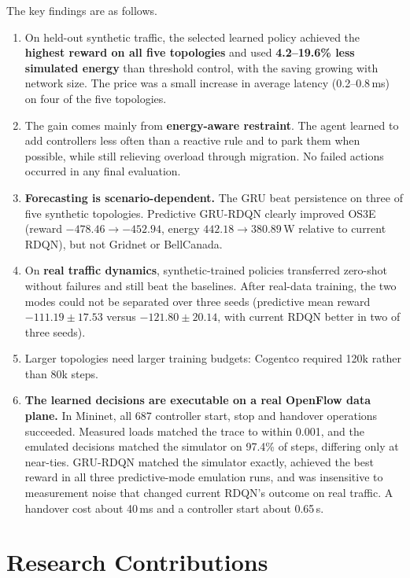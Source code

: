 The key findings are as follows.
\begin{enumerate}[leftmargin=*]
  \item On held-out synthetic traffic, the selected learned policy achieved the \textbf{highest reward on all five topologies} and used \textbf{4.2--19.6\% less simulated energy} than threshold control, with the saving growing with network size. The price was a small increase in average latency (0.2--0.8\,ms) on four of the five topologies.
  \item The gain comes mainly from \textbf{energy-aware restraint}. The agent learned to add controllers less often than a reactive rule and to park them when possible, while still relieving overload through migration. No failed actions occurred in any final evaluation.
  \item \textbf{Forecasting is scenario-dependent.} The GRU beat persistence on three of five synthetic topologies. Predictive GRU-RDQN clearly improved OS3E (reward $-478.46\rightarrow-452.94$, energy $442.18\rightarrow380.89$\,W relative to current RDQN), but not Gridnet or BellCanada.
  \item On \textbf{real traffic dynamics}, synthetic-trained policies transferred zero-shot without failures and still beat the baselines. After real-data training, the two modes could not be separated over three seeds (predictive mean reward $-111.19\pm17.53$ versus $-121.80\pm20.14$, with current RDQN better in two of three seeds).
  \item Larger topologies need larger training budgets: Cogentco required 120k rather than 80k steps.
  \item \textbf{The learned decisions are executable on a real OpenFlow data plane.} In Mininet, all 687 controller start, stop and handover operations succeeded. Measured loads matched the trace to within 0.001, and the emulated decisions matched the simulator on 97.4\% of steps, differing only at near-ties. GRU-RDQN matched the simulator exactly, achieved the best reward in all three predictive-mode emulation runs, and was insensitive to measurement noise that changed current RDQN's outcome on real traffic. A handover cost about 40\,ms and a controller start about 0.65\,s.
\end{enumerate}

\section{Research Contributions}

